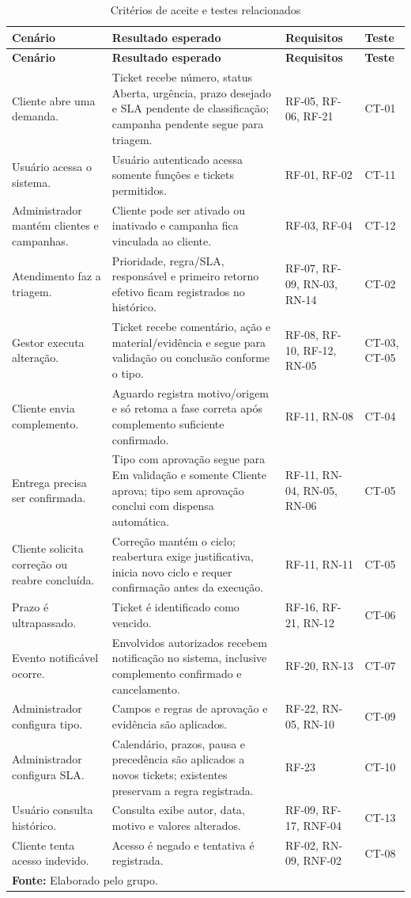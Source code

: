 \scriptsize
\begin{longtable}{p{}p{}p{}p{}}
\caption{Critérios de aceite e testes relacionados}\label{tab:criterios-aceite}\\
\hline
\textbf{Cenário} & \textbf{Resultado esperado} & \textbf{Requisitos} & \textbf{Teste} \\
\hline
\endfirsthead
\hline
\textbf{Cenário} & \textbf{Resultado esperado} & \textbf{Requisitos} & \textbf{Teste} \\
\hline
\endhead
Cliente abre uma demanda. & Ticket recebe número, status Aberta, urgência, prazo desejado e SLA pendente de classificação; campanha pendente segue para triagem. & RF-05, RF-06, RF-21 & CT-01 \\
Usuário acessa o sistema. & Usuário autenticado acessa somente funções e tickets permitidos. & RF-01, RF-02 & CT-11 \\
Administrador mantém clientes e campanhas. & Cliente pode ser ativado ou inativado e campanha fica vinculada ao cliente. & RF-03, RF-04 & CT-12 \\
Atendimento faz a triagem. & Prioridade, regra/SLA, responsável e primeiro retorno efetivo ficam registrados no histórico. & RF-07, RF-09, RN-03, RN-14 & CT-02 \\
Gestor executa alteração. & Ticket recebe comentário, ação e material/evidência e segue para validação ou conclusão conforme o tipo. & RF-08, RF-10, RF-12, RN-05 & CT-03, CT-05 \\
Cliente envia complemento. & Aguardo registra motivo/origem e só retoma a fase correta após complemento suficiente confirmado. & RF-11, RN-08 & CT-04 \\
Entrega precisa ser confirmada. & Tipo com aprovação segue para Em validação e somente Cliente aprova; tipo sem aprovação conclui com dispensa automática. & RF-11, RN-04, RN-05, RN-06 & CT-05 \\
Cliente solicita correção ou reabre concluída. & Correção mantém o ciclo; reabertura exige justificativa, inicia novo ciclo e requer confirmação antes da execução. & RF-11, RN-11 & CT-05 \\
Prazo é ultrapassado. & Ticket é identificado como vencido. & RF-16, RF-21, RN-12 & CT-06 \\
Evento notificável ocorre. & Envolvidos autorizados recebem notificação no sistema, inclusive complemento confirmado e cancelamento. & RF-20, RN-13 & CT-07 \\
Administrador configura tipo. & Campos e regras de aprovação e evidência são aplicados. & RF-22, RN-05, RN-10 & CT-09 \\
Administrador configura SLA. & Calendário, prazos, pausa e precedência são aplicados a novos tickets; existentes preservam a regra registrada. & RF-23 & CT-10 \\
Usuário consulta histórico. & Consulta exibe autor, data, motivo e valores alterados. & RF-09, RF-17, RNF-04 & CT-13 \\
Cliente tenta acesso indevido. & Acesso é negado e tentativa é registrada. & RF-02, RN-09, RNF-02 & CT-08 \\
\hline
\multicolumn{4}{l}{\footnotesize\textbf{Fonte:} Elaborado pelo grupo.}
\end{longtable}
